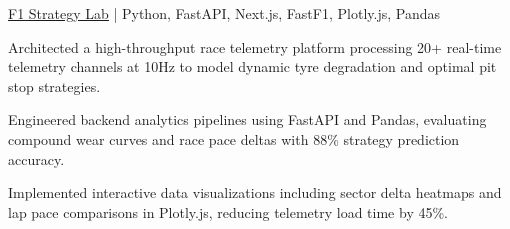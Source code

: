 \begin{cvproject}{\href{https://github.com/grvsnh/f1-strategy-lab}{\uline{F1 Strategy Lab}} | Python, FastAPI, Next.js, FastF1, Plotly.js, Pandas}{}
    \item Architected a high-throughput race telemetry platform processing 20+ real-time telemetry channels at 10Hz to model dynamic tyre degradation and optimal pit stop strategies.
    \item Engineered backend analytics pipelines using FastAPI and Pandas, evaluating compound wear curves and race pace deltas with 88\% strategy prediction accuracy.
    \item Implemented interactive data visualizations including sector delta heatmaps and lap pace comparisons in Plotly.js, reducing telemetry load time by 45\%.
\end{cvproject}